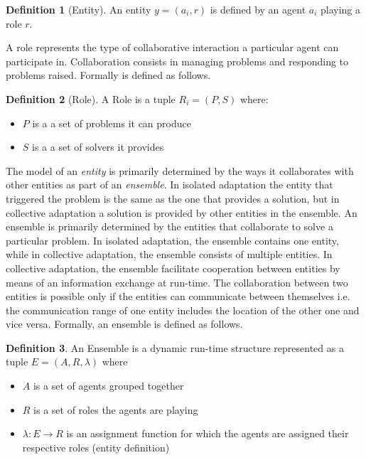 \documentclass[journal]{IEEEtran}
\theoremstyle{definition}
\newtheorem{definition}{Definition}
\begin{document}
\begin{definition} [Entity] An entity $y = (a_i, r)$ is defined by an agent $a_i$ playing a role $r$.
\end{definition}

A role represents the type of collaborative interaction a particular agent can participate in. Collaboration consists in managing problems and  responding to problems raised. Formally is defined as follows.
 
\begin{definition}[Role] A Role is a tuple $R_i=(P, S)$ where:
\begin{itemize}
\item $P$ is a a set of problems it can produce
\item $S$ is a a set of solvers it provides
\end{itemize}
\end{definition}


The model of an \textit{entity} is primarily determined by the ways it collaborates with other entities as part of an \textit{ensemble}.  In isolated adaptation the entity that triggered the problem is the same as the one that provides a solution, but in collective adaptation a solution is provided by other entities in the ensemble. An ensemble is primarily determined by the entities that collaborate to solve a particular problem. In isolated adaptation, the ensemble contains one entity, while in collective adaptation, the ensemble consists of multiple entities. In collective adaptation, the ensemble facilitate cooperation between entities by means of an information exchange at run-time. The collaboration between two entities is possible only if the entities can communicate between themselves i.e. the communication range of one entity includes the location of the other one and vice versa.
Formally, an ensemble is defined as follows.

\begin{definition}
An Ensemble is a dynamic run-time structure represented as a tuple $E=(A, R, \lambda)$ where
 \begin{itemize}
\item $A$ is a set of agents grouped together 
\item $R$ is a set of roles the agents are playing
\item $\lambda: E \rightarrow R $ is an assignment function for which the agents are assigned their respective roles (entity definition)
 \end{itemize}
\end{definition}
\end{document}
